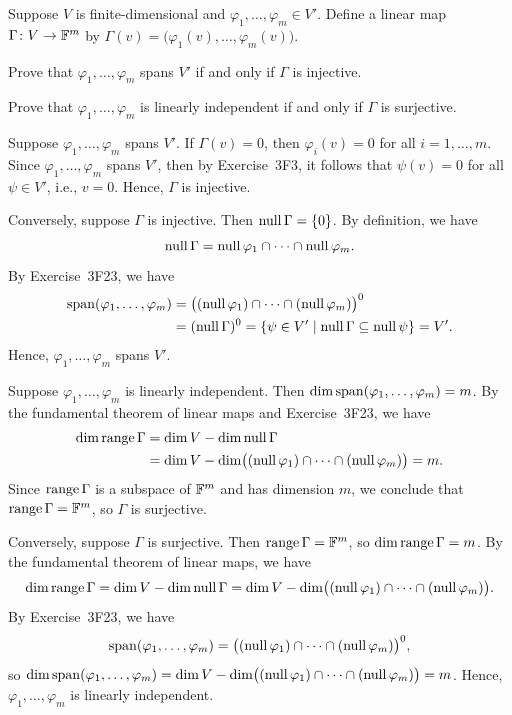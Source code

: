 \begin{exercise}
Suppose $V$ is finite-dimensional and $\varphi_1,\dots,\varphi_m\in V'$. Define
a linear map $\Gamma\colon V\to\mathbb{F}^m$ by
$\Gamma(v)=\bigl(\varphi_1(v),\dots,\varphi_m(v)\bigr)$.
\begin{parts}
\item Prove that $\varphi_1,\dots,\varphi_m$ spans $V'$ if and only if $\Gamma$
  is injective.
\item Prove that $\varphi_1,\dots,\varphi_m$ is linearly independent if and only
  if $\Gamma$ is surjective.
\end{parts}
\end{exercise}
\begin{solution}\leavevmode
\begin{parts}
\item Suppose $\varphi_1,\dots,\varphi_m$ spans $V'$. If $\Gamma(v)=0$, then
  $\varphi_i(v)=0$ for all $i=1,\dots,m$. Since $\varphi_1,\dots,\varphi_m$
  spans $V'$, then by Exercise~3F3, it follows that $\psi(v)=0$ for all
  $\psi\in V'$, i.e., $v=0$. Hence, $\Gamma$ is injective.

  Conversely, suppose $\Gamma$ is injective. Then $\operatorname{null}\Gamma=\{0\}$. By
  definition, we have
  \[ \operatorname{null}\Gamma = \operatorname{null}\varphi_1\cap\cdots\cap\operatorname{null}\varphi_m. \]
  By Exercise~3F23, we have
  \begin{align*}
  \operatorname{span}(\varphi_1,\dots,\varphi_m)
   &= \bigl((\operatorname{null}\varphi_1)\cap\cdots\cap(\operatorname{null}\varphi_m)\bigr)^0\\
   &= (\operatorname{null}\Gamma)^0 = \{\psi\in V' \mid \operatorname{null}\Gamma\subseteq\operatorname{null}\psi\} = V'.
  \end{align*}
  Hence, $\varphi_1,\dots,\varphi_m$ spans $V'$.
\item Suppose $\varphi_1,\dots,\varphi_m$ is linearly independent. Then
  $\operatorname{dim}\operatorname{span}(\varphi_1,\dots,\varphi_m)=m$. By the fundamental theorem of linear
  maps and Exercise~3F23, we have
  \begin{align*}
  \operatorname{dim}\operatorname{range}\Gamma &= \operatorname{dim} V-\operatorname{dim}\operatorname{null}\Gamma\\
   &= \operatorname{dim} V-\operatorname{dim}\bigl((\operatorname{null}\varphi_1)\cap\cdots\cap(\operatorname{null}\varphi_m)\bigr) = m.
  \end{align*}
  Since $\operatorname{range}\Gamma$ is a subspace of $\mathbb{F}^m$ and has dimension $m$, we
  conclude that $\operatorname{range}\Gamma=\mathbb{F}^m$, so $\Gamma$ is surjective.

  Conversely, suppose $\Gamma$ is surjective. Then $\operatorname{range}\Gamma=\mathbb{F}^m$, so
  $\operatorname{dim}\operatorname{range}\Gamma=m$. By the fundamental theorem of linear maps, we have
  \[ \operatorname{dim}\operatorname{range}\Gamma = \operatorname{dim} V-\operatorname{dim}\operatorname{null}\Gamma
     = \operatorname{dim} V-\operatorname{dim}\bigl((\operatorname{null}\varphi_1)\cap\cdots\cap(\operatorname{null}\varphi_m)\bigr). \]
  By Exercise~3F23, we have
  \[ \operatorname{span}(\varphi_1,\dots,\varphi_m)
     = \bigl((\operatorname{null}\varphi_1)\cap\cdots\cap(\operatorname{null}\varphi_m)\bigr)^0, \]
  so $\operatorname{dim}\operatorname{span}(\varphi_1,\dots,\varphi_m)
  =\operatorname{dim} V-\operatorname{dim}\bigl((\operatorname{null}\varphi_1)\cap\cdots\cap(\operatorname{null}\varphi_m)\bigr)=m$.
  Hence, $\varphi_1,\dots,\varphi_m$ is linearly independent.
\end{parts}
\end{solution}

